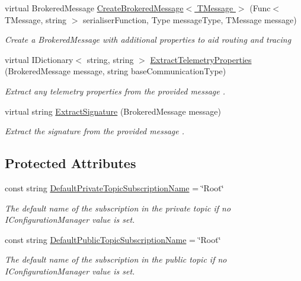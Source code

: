 \begin{DoxyCompactItemize}
virtual Brokered\+Message \hyperlink{classCqrs_1_1Azure_1_1ServiceBus_1_1AzureServiceBus_abd7070403c94e0b404ffa00c07c94a50_abd7070403c94e0b404ffa00c07c94a50}{Create\+Brokered\+Message$<$ T\+Message $>$} (Func$<$ T\+Message, string $>$ serialiser\+Function, Type message\+Type, T\+Message message)
\begin{DoxyCompactList}\small\item\em Create a Brokered\+Message with additional properties to aid routing and tracing \end{DoxyCompactList}\item 
virtual I\+Dictionary$<$ string, string $>$ \hyperlink{classCqrs_1_1Azure_1_1ServiceBus_1_1AzureServiceBus_a735e3fddc6abec6a7eaa76acde57f46a_a735e3fddc6abec6a7eaa76acde57f46a}{Extract\+Telemetry\+Properties} (Brokered\+Message message, string base\+Communication\+Type)
\begin{DoxyCompactList}\small\item\em Extract any telemetry properties from the provided {\itshape message} . \end{DoxyCompactList}\item 
virtual string \hyperlink{classCqrs_1_1Azure_1_1ServiceBus_1_1AzureServiceBus_a6efd119a61f555a4a8c456f4821e83bf_a6efd119a61f555a4a8c456f4821e83bf}{Extract\+Signature} (Brokered\+Message message)
\begin{DoxyCompactList}\small\item\em Extract the signature from the provided {\itshape message} . \end{DoxyCompactList}\end{DoxyCompactItemize}
\subsection*{Protected Attributes}
\begin{DoxyCompactItemize}
\item 
const string \hyperlink{classCqrs_1_1Azure_1_1ServiceBus_1_1AzureServiceBus_adbfdf69ded51320d81fce8e652af9b88_adbfdf69ded51320d81fce8e652af9b88}{Default\+Private\+Topic\+Subscription\+Name} = \char`\"{}Root\char`\"{}
\begin{DoxyCompactList}\small\item\em The default name of the subscription in the private topic if no I\+Configuration\+Manager value is set. \end{DoxyCompactList}\item 
const string \hyperlink{classCqrs_1_1Azure_1_1ServiceBus_1_1AzureServiceBus_a278db23f67223fbb25455038c7fa1ebf_a278db23f67223fbb25455038c7fa1ebf}{Default\+Public\+Topic\+Subscription\+Name} = \char`\"{}Root\char`\"{}
\begin{DoxyCompactList}\small\item\em The default name of the subscription in the public topic if no I\+Configuration\+Manager value is set. \end{DoxyCompactList}\end{DoxyCompactItemize}
